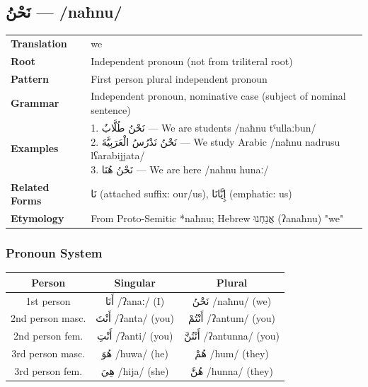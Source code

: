 \documentclass[letterpaper,12pt]{article}
\begin{document}
\subsection{\textarabic{نَحْنُ} — /naħnu/}
\begin{tabular}{p{3cm}p{10cm}}
\toprule
\textbf{Translation} & we \\
\textbf{Root} & Independent pronoun (not from triliteral root) \\
\textbf{Pattern} & First person plural independent pronoun \\
\textbf{Grammar} & Independent pronoun, nominative case (subject of nominal sentence) \\
\midrule
\textbf{Examples} & \makecell[l]{\parbox{9.5cm}{
1. \textarabic{نَحْنُ طُلَّابٌ} — We are students /naħnu tˤullaːbun/\\
2. \textarabic{نَحْنُ نَدْرُسُ الْعَرَبِيَّةَ} — We study Arabic /naħnu nadrusu lʕarabijjata/\\
3. \textarabic{نَحْنُ هُنَا} — We are here /naħnu hunaː/
}} \\
\midrule
\textbf{Related Forms} & \textarabic{نَا} (attached suffix: our/us), \textarabic{إِيَّانَا} (emphatic: us) \\
\textbf{Etymology} & From Proto-Semitic *naħnu; Hebrew \texthebrew{אֲנַחְנוּ} (ʔanaħnu) "we" \\
\bottomrule
\end{tabular}

\subsubsection*{Pronoun System}
\begin{tabular}{|c|c|c|}
\hline
\textbf{Person} & \textbf{Singular} & \textbf{Plural} \\
\hline
1st person & \textarabic{أَنَا} /ʔanaː/ (I) & \textarabic{نَحْنُ} /naħnu/ (we) \\
\hline
2nd person masc. & \textarabic{أَنْتَ} /ʔanta/ (you) & \textarabic{أَنْتُمْ} /ʔantum/ (you) \\
\hline
2nd person fem. & \textarabic{أَنْتِ} /ʔanti/ (you) & \textarabic{أَنْتُنَّ} /ʔantunna/ (you) \\
\hline
3rd person masc. & \textarabic{هُوَ} /huwa/ (he) & \textarabic{هُمْ} /hum/ (they) \\
\hline
3rd person fem. & \textarabic{هِيَ} /hija/ (she) & \textarabic{هُنَّ} /hunna/ (they) \\
\hline
\end{tabular}
\end{document}
